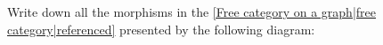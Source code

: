
Write down all the morphisms in the \ref{Free category on a graph|free category|referenced} presented by the following diagram:


